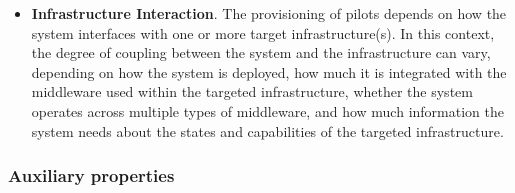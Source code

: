 \documentclass{sig-alternate}
\begin{document}
\begin{itemize}

\item \textbf{Infrastructure Interaction}. The provisioning of pilots
  depends on how the \pilot system interfaces with one or more target
  infrastructure(s). In this context, the degree of coupling between the \pilot
  system and the infrastructure can vary, depending on how the \pilot system is
  deployed, how much it is integrated with the middleware used within the
  targeted infrastructure, whether the \pilot system operates across multiple
  types of middleware, and how much information the \pilot system needs about
  the states and capabilities of the targeted infrastructure.

\end{itemize}


\subsubsection{Auxiliary properties}
\label{sec:auxprops}
\end{document}
